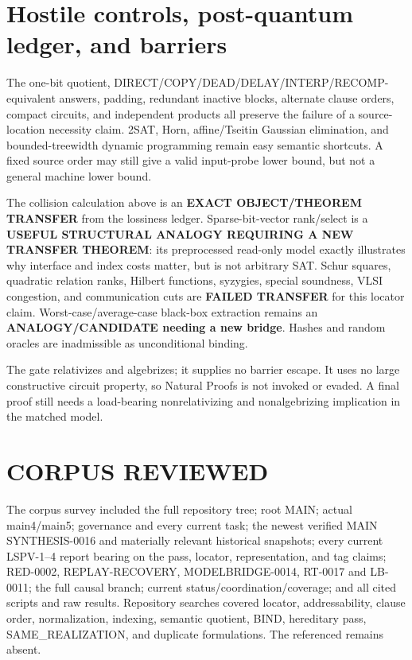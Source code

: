 \documentclass[11pt]{article}
\begin{document}
\section{Hostile controls, post-quantum ledger, and barriers}

The one-bit quotient, DIRECT/COPY/DEAD/DELAY/INTERP/RECOMP-equivalent answers,
padding, redundant inactive blocks, alternate clause orders, compact circuits,
and independent products all preserve the failure of a source-location
necessity claim.  2SAT, Horn, affine/Tseitin Gaussian elimination, and
bounded-treewidth dynamic programming remain easy semantic shortcuts.  A
fixed source order may still give a valid input-probe lower bound, but not a
general machine lower bound.

The collision calculation above is an \textbf{EXACT OBJECT/THEOREM TRANSFER}
from the lossiness ledger.  Sparse-bit-vector rank/select is a
\textbf{USEFUL STRUCTURAL ANALOGY REQUIRING A NEW TRANSFER THEOREM}: its
preprocessed read-only model exactly illustrates why interface and index
costs matter, but is not arbitrary SAT.  Schur squares, quadratic relation
ranks, Hilbert functions, syzygies, special soundness, VLSI congestion, and
communication cuts are \textbf{FAILED TRANSFER} for this locator claim.
Worst-case/average-case black-box extraction remains an
\textbf{ANALOGY/CANDIDATE needing a new bridge}.  Hashes and random oracles
are inadmissible as unconditional binding.

The gate relativizes and algebrizes; it supplies no barrier escape.  It uses
no large constructive circuit property, so Natural Proofs is not invoked or
evaded.  A final proof still needs a load-bearing nonrelativizing and
nonalgebrizing implication in the matched model.

\section{CORPUS REVIEWED}

The corpus survey included the full repository tree; root MAIN; actual
main4/main5; governance and every current task; the newest verified MAIN
SYNTHESIS-0016 and materially relevant historical snapshots; every current
LSPV-1--4 report bearing on the pass, locator, representation, and tag claims;
RED-0002, REPLAY-RECOVERY, MODELBRIDGE-0014, RT-0017 and LB-0011; the full
causal branch; current status/coordination/coverage; and all cited scripts and
raw results.  Repository searches covered locator, addressability, clause
order, normalization, indexing, semantic quotient, BIND, hereditary pass,
SAME\_REALIZATION, and duplicate formulations.  The referenced
 remains absent.
\end{document}
